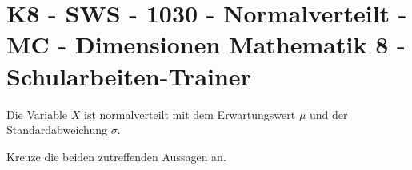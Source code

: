 \section{K8 - SWS - 1030 - Normalverteilt - MC - Dimensionen Mathematik 8 - Schularbeiten-Trainer}

\begin{beispiel}[K8 - SWS]{1}
Die Variable $X$ ist normalverteilt mit dem Erwartungswert $\mu$ und der Standardabweichung $\sigma$.

Kreuze die beiden zutreffenden Aussagen an.

\end{beispiel}